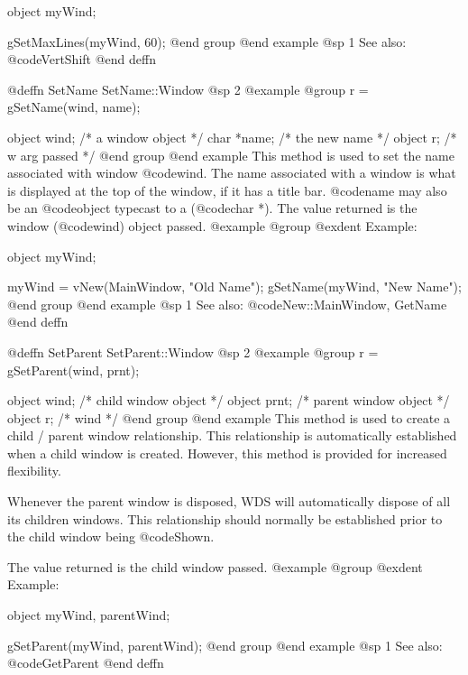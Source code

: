 object  myWind;

gSetMaxLines(myWind, 60);
@end group
@end example
@sp 1
See also:  @code{VertShift}
@end deffn













@deffn {SetName} SetName::Window
@sp 2
@example
@group
r = gSetName(wind, name);

object  wind;   /*  a window object     */
char   *name;   /*  the new name        */
object  r;      /*  w arg passed        */
@end group
@end example
This method is used to set the name associated with window @code{wind}.
The name associated with a window is what is displayed at the top of the
window, if it has a title bar.  @code{name} may also be an @code{object}
typecast to a (@code{char *}).  The value returned is the window
(@code{wind}) object passed.
@example
@group
@exdent Example:

object  myWind;

myWind = vNew(MainWindow, "Old Name");
gSetName(myWind, "New Name");
@end group
@end example
@sp 1
See also:  @code{New::MainWindow, GetName}
@end deffn













@deffn {SetParent} SetParent::Window
@sp 2
@example
@group
r = gSetParent(wind, prnt);

object  wind;   /*  child window object   */
object  prnt;   /*  parent window object  */
object  r;      /*  wind                  */
@end group
@end example
This method is used to create a child / parent window relationship.
This relationship is automatically established when a child window is
created.  However, this method is provided for increased flexibility.

Whenever the parent window is disposed, WDS will automatically dispose
of all its children windows.  This relationship should normally be
established prior to the child window being @code{Shown}.

The value returned is the child window passed.
@example
@group
@exdent Example:

object  myWind, parentWind;

gSetParent(myWind, parentWind);
@end group
@end example
@sp 1
See also:  @code{GetParent}
@end deffn
















